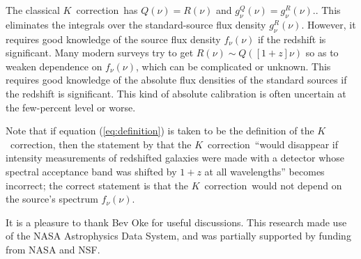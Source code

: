 \documentclass[preprint]{aastex}
\newcommand{\kcorrection}{$K$~correction}
\begin{document}
The classical \kcorrection\ has $Q(\nu)=R(\nu)$ and
$g^Q_{\nu}(\nu)=g^R_{\nu}(\nu)$..  This eliminates the integrals over
the standard-source flux density $g^R_{\nu}(\nu)$.  However, it
requires good knowledge of the source flux density $f_{\nu}(\nu)$ if
the redshift is significant.  Many modern surveys try to get
$R(\nu)\sim Q([1+z]\nu)$ so as to weaken dependence on $f_{\nu}(\nu)$,
which can be complicated or unknown.  This requires good knowledge of
the absolute flux densities of the standard sources if the redshift is
significant.  This kind of absolute calibration is often uncertain at
the few-percent level or worse.

Note that if equation (\ref{eq:definition}) is taken to be the
definition of the \kcorrection, then the statement by \citet{oke68a}
that the \kcorrection\ ``would disappear if intensity measurements of
redshifted galaxies were made with a detector whose spectral
acceptance band was shifted by $1+z$ at all wavelengths'' becomes
incorrect; the correct statement is that the \kcorrection\ would not
depend on the source's spectrum $f_{\nu}(\nu)$.

\acknowledgements It is a pleasure to thank Bev Oke for useful
discussions.  This research made use of the NASA Astrophysics Data
System, and was partially supported by funding from NASA and NSF.



\end{document}
